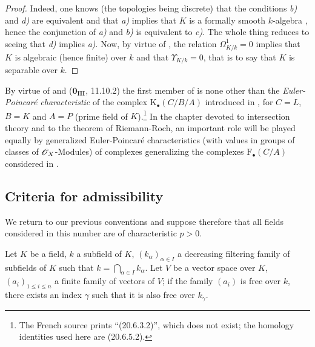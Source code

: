 \begin{proof}
Indeed, one knows (the topologies being discrete) that the conditions \emph{b)} and \emph{d)} are equivalent  and that \emph{a)} implies that $K$ is a formally smooth $k$-algebra , hence the conjunction of \emph{a)} and \emph{b)} is equivalent to \emph{c)}.
The whole thing reduces to seeing that \emph{d)} implies \emph{a)}.
Now, by virtue of , the relation $\Omega^1_{K/k}=0$ implies that $K$ is algebraic (hence finite) over $k$ and that $\Upsilon_{K/k}=0$, that is to say  that $K$ is separable over $k$.
\end{proof}

\begin{remark}[21.7.5]
\label{0.21.7.5}
By virtue of  and ($\mathbf{0_{III}}$, 11.10.2) the first member of  is none other than the \emph{Euler-Poincar\'e characteristic} of the complex $\mathrm{K}_\bullet(C/B/A)$ introduced in , for $C=L$, $B=K$ and $A=P$ (prime field of $K$).\footnote{The French source prints ``(20.6.3.2)'', which does not exist; the homology identities used here are (20.6.5.2).}
In the chapter devoted to intersection theory and to the theorem of Riemann-Roch, an important role will be played equally by generalized Euler-Poincar\'e characteristics (with values in groups of classes of $\mathscr{O}_X$-Modules) of complexes generalizing the complexes $\mathrm{F}_\bullet(C/A)$ considered in .
\end{remark}

\subsection{Criteria for admissibility}
\label{subsection:0.21.8}

We return to our previous conventions and suppose therefore that all fields considered in this number are of characteristic $p>0$.

\begin{lemma}[21.8.1]
\label{0.21.8.1}
Let $K$ be a field, $k$ a subfield of $K$, $(k_\alpha)_{\alpha\in I}$ a decreasing filtering family of subfields of $K$ such that $k=\bigcap_{\alpha\in I}k_\alpha$.
Let $V$ be a vector space over $K$, $(a_i)_{1\leqslant i\leqslant n}$ a finite family of vectors of $V$; if the family $(a_i)$ is free over $k$, there exists an index $\gamma$ such that it is also free over $k_\gamma$.
\end{lemma}

